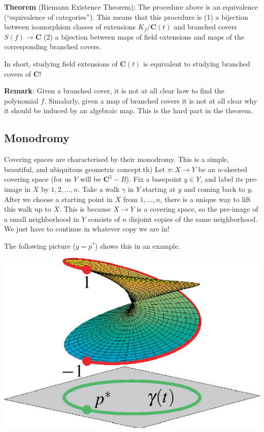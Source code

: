 \documentclass[11pt]{article}
\begin{document}
\textbf{\textbf{Theorem}} (Riemann Existence Theorem):
The procedure above is an equivalence (``equivalence of categories'').
This means that this procedure is (1) a bijection between isomorphism classes of extensions \(K_f / \mathbf{C}(t)\) and branched covers \(S(f) \to \mathbf{C}\)  (2) a bijection between maps of field extensions and maps of the corresponding branched covers.

In short, studying field extensions of \(\mathbf{C}(t)\) is equivalent to studying branched covers of \(\mathbf{C}\)!

\textbf{\textbf{Remark}}: Given a branched cover, it is not at all clear how to find the polynomial \(f\).  Simalarly, given a map of branched covers it is not at all clear why it should be induced by an algebraic map.  This is the hard part in the theorem.
\subsection{Monodromy}
\label{sec:org98472d1}
Covering spaces are characterised by their monodromy.
This is a simple, beautiful, and ubiquitous geometric concept.th)
Let \(\pi \colon X \to Y\) be an \(n\)-sheeted covering space (for us \(Y\) will be \(\mathbf{C}^2 - B\)).
Fix a basepoint \(y \in Y\), and label its pre-image in \(X\) by \(1,2,\dots,n\).
Take a walk \(\gamma\) in \(Y\) starting at \(y\) and coming back to \(y\).
After we choose a starting point in \(X\) from \(1,\dots, n\), there is a unique way to lift this walk up to \(X\).
This is because \(X \to Y\) is a covering space, so the pre-image of a small neighborhood in \(Y\) consists of \(n\) disjoint copies of the same neighborhood.
We just have to continue in whatever copy we are in!

The following picture (\(y = p^{*}\)) shows this in an example.
\begin{center}
\includegraphics[width=.9\linewidth]{assets/Course_notes/2023-03-24_14-26-49_491839_1_En_4_Fig2_HTML.png}
\end{center}
\end{document}

